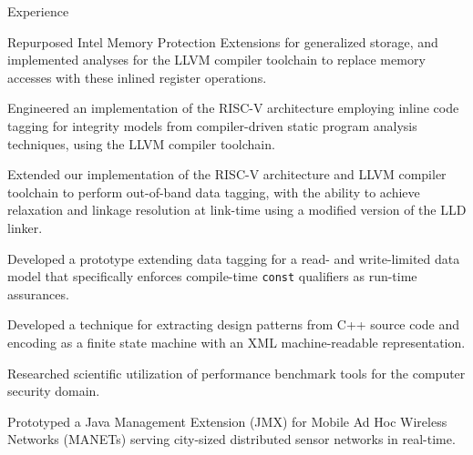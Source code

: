 
\begin{rubric}{Experience}


\entry*[01/2016 \-- 08/2023] 
\par \begin{list1}
	\item Repurposed Intel Memory Protection Extensions for generalized storage, and implemented analyses for the LLVM compiler toolchain to replace memory accesses with these inlined register operations.
	\item Engineered an implementation of the RISC-V architecture employing inline code tagging for integrity models from compiler-driven static program analysis techniques, using the LLVM compiler toolchain.
	\item Extended our implementation of the RISC-V architecture and LLVM compiler toolchain to perform out-of-band data tagging, with the ability to achieve relaxation and linkage resolution at link-time using a modified version of the LLD linker.
	\item Developed a prototype extending data tagging for a read- and write-limited data model that specifically enforces compile-time \texttt{const} qualifiers as run-time assurances.
	\item Developed a technique for extracting design patterns from C++ source code and encoding as a finite state machine with an XML machine-readable representation.
	\item Researched scientific utilization of performance benchmark tools for the computer security domain.
\end{list1}
\entry*[05/2004 \-- 08/2004] 
\par \begin{list1}
		\item Prototyped a Java Management Extension (JMX) for Mobile Ad Hoc Wireless Networks (MANETs) serving city-sized distributed sensor networks in real-time.
	\end{list1}



\end{rubric}
